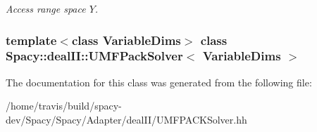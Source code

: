 \begin{DoxyCompactItemize}
\begin{DoxyCompactList}\small\item\em \-Access range space $Y$. \end{DoxyCompactList}\end{DoxyCompactItemize}
\subsubsection*{template$<$class Variable\-Dims$>$ class Spacy\-::deal\-I\-I\-::\-U\-M\-F\-Pack\-Solver$<$ Variable\-Dims $>$}



\-The documentation for this class was generated from the following file\-:\begin{DoxyCompactItemize}
\item 
/home/travis/build/spacy-\/dev/\-Spacy/\-Spacy/\-Adapter/deal\-I\-I/\-U\-M\-F\-P\-A\-C\-K\-Solver.\-hh\end{DoxyCompactItemize}
